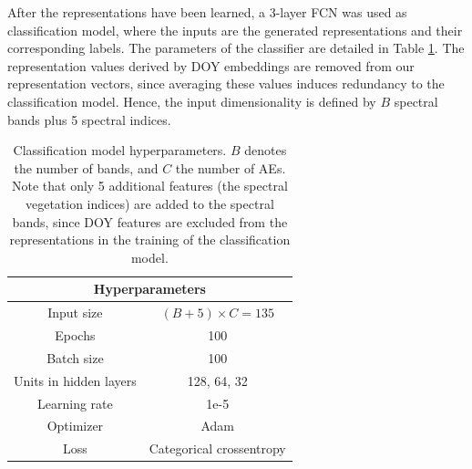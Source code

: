 \documentclass[journal,article,submit,pdftex,moreauthors]{Definitions/mdpi}
\begin{document}

After the representations have been learned, a 3-layer FCN was used as classification model, where the inputs are the generated representations and their corresponding labels. The parameters of the classifier are detailed in Table \ref{fcn_hyperparameters}.
The representation values derived by DOY embeddings are removed from our representation vectors, since averaging these values induces redundancy to the classification model. Hence, the input dimensionality is defined by $B$ spectral bands plus 5 spectral indices.
\begin{table}[H]
	\centering
	\caption{Classification model hyperparameters. $B$ denotes the number of bands, and $C$ the number of AEs. Note that only 5 additional features (the spectral vegetation indices) are added to the spectral bands, since DOY features are excluded from the representations in the training of the classification model.}
	\begin{tabular}{c|c}
	\hline
		\multicolumn{2}{c}{Hyperparameters} \\ \hline
		Input size & $(B + 5) \times C = 135$ \\
		Epochs & 100 \\ 
		Batch size & 100\\ 
		Units in hidden layers & 128, 64, 32 \\  
		Learning rate & 1e-5 \\
		Optimizer & Adam \\ 
		Loss & Categorical crossentropy \\ \hline
	\end{tabular}
	\label{fcn_hyperparameters}
\end{table}

\end{document}
